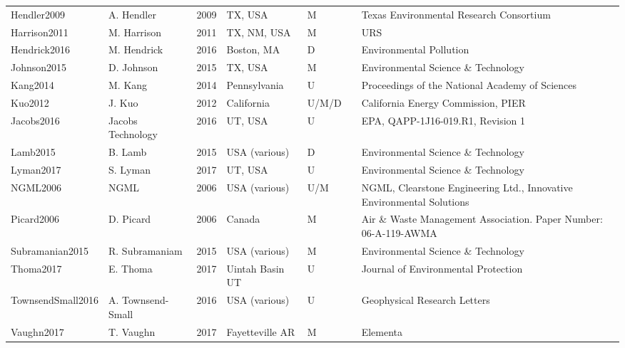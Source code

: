 \documentclass[11pt]{report}
\begin{document}
{{{{\begin{landscape}
\begin{table}[]
\begin{scriptsize}
\begin{tabular*}{1\columnwidth}{lllllll}
Hendler2009		& A.  Hendler  		& 2009 	& TX, USA        	& M     	&\cite{Hendler2009}         & Texas Environmental Research Consortium         \\
Harrison2011      	& M. Harrison  	& 2011 	& TX, NM, USA    	& M     	& \cite{Harrison2011} & URS     \\
Hendrick2016      	& M. Hendrick 		 & 2016 	& Boston, MA     	& D     	& \cite{Hendrick2016}& Environmental Pollution     \\
Johnson2015       	& D. Johnson   	& 2015 	& TX, USA        	& M     	& \cite{Johnson2015}      & Environmental Science \& Technology   \\
Kang2014	& M. Kang      		& 2014 	& Pennsylvania   	& U     	& \cite{Kang2014}      & Proceedings of the National Academy of Sciences \\
Kuo2012 	& J. Kuo       		& 2012 	& California     		& U/M/D 	& \cite{Kuo2012}         & California Energy Commission, PIER    \\
Jacobs2016        	& Jacobs Technology      	& 2016 	& UT, USA        	& U     	& \cite{Jacobs2016}       & EPA, QAPP-1J16-019.R1, Revision 1     \\
Lamb2015	& B. Lamb      		& 2015 	& USA (various)  	& D     	& \cite{Lamb2015}      & Environmental Science \& Technology   \\
Lyman2017         	& S. Lyman     		& 2017 	& UT, USA        	& U     	& \cite{Lyman2017}   & Environmental Science \& Technology   \\
NGML2006         	& NGML         		& 2006 	& USA (various)  	& U/M   	& \cite{NGML2006}         				 & NGML, Clearstone Engineering Ltd., Innovative Environmental Solutions         \\
Picard2006        	& D. Picard    		& 2006 	& Canada         	& M     	& \cite{Picard2006}& Air \& Waste Management Association. Paper Number: 06-A-119-AWMA    \\     
Subramanian2015   	& R. Subramaniam         	& 2015 	& USA (various)  	& M     	& \cite{Subramanian2015}   						 & Environmental Science \& Technology   \\
Thoma2017        	& E. Thoma     	& 2017 	& Uintah Basin UT	& U     	& \cite{Thoma2017}        & Journal of Environmental Protection   \\
TownsendSmall2016 & A. Townsend-Small      	& 2016 	& USA (various)  	& U     	& \cite{TownsendSmall2016}        & Geophysical Research Letters       \\
Vaughn2017        	& T. Vaughn   		& 2017 	& Fayetteville AR	& M     	& \cite{Vaughn2017}        & Elementa\\

\end{tabular*}
\end{scriptsize}
\end{table}
\end{landscape}}}}}
\end{document}
